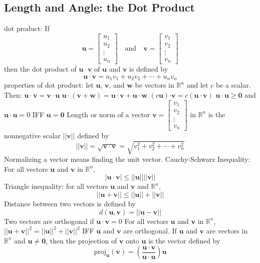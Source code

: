 \documentclass{article}
\begin{document}
        \subsection{Length and Angle: the Dot Product}
        \begin{outline}
            \1 dot product: If \[\mathbf u=\begin{bmatrix}u_1\\u_2\\\vdots\\u_n\end{bmatrix}\quad\text{and}\quad\mathbf v=\begin{bmatrix}v_1\\v_2\\\vdots\\v_n\end{bmatrix}\] then the dot product of \(\mathbf u\cdot\mathbf v\) of \(\mathbf u\) and \(\mathbf v\) is defined by \[\mathbf u\cdot\mathbf v=u_1v_1+u_2v_2+\cdots+u_nv_n\]
            \1 properties of dot product: let \(\mathbf u\), \(\mathbf v\), and \(\mathbf w\) be vectors in \(\mathbb R^n\) and let $c$ be a scalar. Then: 
                \2 \(\mathbf{u\cdot v}=\mathbf{v\cdot u}\)
                \2 \(\mathbf{u\cdot}(\mathbf{v+w})=\mathbf{u\cdot v+u\cdot w}\)
                \2 \((c\mathbf u)\mathbf{\cdot v}=c(\mathbf{u\cdot v})\)
                \2 \(\mathbf{u\cdot u\geq 0}\) and \(\mathbf{u\cdot u}=0\) IFF \(\mathbf u=\mathbf 0\)
                \2 Length or norm of a vector \(\mathbf v=\begin{bmatrix}v_1\\v_2\\\vdots\\v_n\end{bmatrix}\) in \(\mathbb R^n\) is the nonnegative scalar \(||\mathbf v||\) defined by \[||\mathbf v||=\sqrt{\mathbf{v\cdot v}}=\sqrt{v_1^2+v_2^2+\cdots+v_n^2}\]
            \1 Normalizing a vector means finding the unit vector. 
            \1 Cauchy-Schwarz Inequality: For all vectors \(\mathbf u\) and \(\mathbf v\) in \(\mathbb R^n\), \[|\mathbf{u\cdot v}|\leq ||\mathbf u||||\mathbf v||\]
            \1 Triangle inequality: for all vectors \(\mathbf u\) and \(\mathbf v\) and \(\mathbb R^n\), \[||\mathbf u+\mathbf v||\leq||\mathbf u||+||\mathbf v||\]
            \1 Distance between two vectors is defined by \[d(\mathbf u,\mathbf v)=||\mathbf u-\mathbf v||\]
            \1 Two vectors are orthogonal if \(\mathbf u\cdot\mathbf v=0\)
            \1 For all vectors \(\mathbf u\) and \(\mathbf v\) in \(\mathbb R^n\), \(||\mathbf u+\mathbf v||^2=||\mathbf u||^2+||\mathbf v||^2\) IFF \(\mathbf u\) and \(\mathbf v\) are orthogonal. 
            \1 If \(\mathbf u\) and \(\mathbf v\) are vectors in \(\mathbb R^n\) and \(\mathbf u\neq\mathbf 0\), then the projection of \(\mathbf v\) onto \(\mathbf u\) is the vector defined by \[\text{proj}_{\mathbf u}(\mathbf v)=\left(\dfrac{\mathbf{u\cdot v}}{\mathbf{u\cdot u}}\right)\mathbf u\]

        \end{outline}
\end{document}
